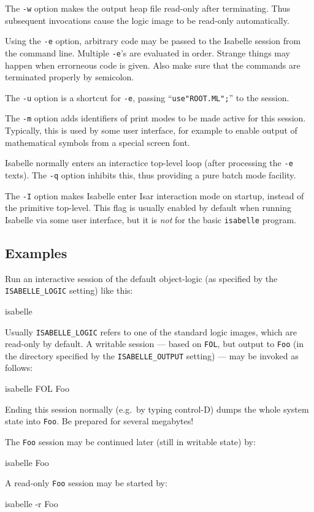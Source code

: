 \medskip The \texttt{-w} option makes the output heap file read-only
after terminating.  Thus subsequent invocations cause the logic image
to be read-only automatically.

\medskip Using the \texttt{-e} option, arbitrary {\ML} code may be
passed to the Isabelle session from the command line. Multiple
\texttt{-e}'s are evaluated in order. Strange things may happen when
errorneous {\ML} code is given. Also make sure that the {\ML} commands
are terminated properly by semicolon.

\medskip The \texttt{-u} option is a shortcut for \texttt{-e}, passing
``\texttt{use"ROOT.ML";}'' to the {\ML} session.

\medskip The \texttt{-m} option adds identifiers of print modes to be
made active for this session. Typically, this is used by some user
interface, for example to enable output of mathematical symbols from a
special screen font.

\medskip Isabelle normally enters an interactice top-level loop (after
processing the \texttt{-e} texts). The \texttt{-q} option inhibits this, thus
providing a pure batch mode facility.

\medskip The \texttt{-I} option makes Isabelle enter Isar interaction mode on
startup, instead of the primitive {\ML} top-level.  This flag is usually
enabled by default when running Isabelle via some user interface, but it is
\emph{not} for the basic \texttt{isabelle} program.


\subsection*{Examples}

Run an interactive session of the default object-logic (as specified
by the \texttt{ISABELLE_LOGIC} setting) like this:
\begin{ttbox}
isabelle
\end{ttbox}
Usually \texttt{ISABELLE_LOGIC} refers to one of the standard logic
images, which are read-only by default.  A writable session --- based
on \texttt{FOL}, but output to \texttt{Foo} (in the directory
specified by the \texttt{ISABELLE_OUTPUT} setting) --- may be invoked
as follows:
\begin{ttbox}
isabelle FOL Foo
\end{ttbox}
Ending this session normally (e.g.\ by typing control-D) dumps the
whole {\ML} system state into \texttt{Foo}. Be prepared for several
megabytes!

The \texttt{Foo} session may be continued later (still in writable
state) by:
\begin{ttbox}
isabelle Foo
\end{ttbox}
A read-only \texttt{Foo} session may be started by:
\begin{ttbox}
isabelle -r Foo
\end{ttbox}

